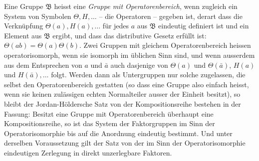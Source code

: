 Eine Gruppe $\mathfrak{B}$ heisst eine \emph{Gruppe mit Operatorenbereich}, wenn zugleich ein System von Symbolen $\Theta,H,\ldots$ -- die Operatoren -- gegeben ist, derart dass die Verknüpfung $\Theta(a),H(a),\ldots$ für jedes $a$ aus $\mathfrak{B}$ eindeutig definiert ist und ein Element aus $\mathfrak{B}$ ergibt, und dass das distributive Gesetz erfüllt ist: $\Theta(ab)=\Theta(a)\Theta(b)$. Zwei Gruppen mit gleichem Operatorenbereich heissen operatorisomorph, wenn sie isomorph im üblichen Sinn sind, und wenn ausserdem aus dem Entsprechen von $a$ und $\bar a$ auch dasjenige von $\Theta(a)$ und $\Theta(\bar a)$, $H(a)$ und $H(\bar a),\ldots$ folgt. Werden dann als Untergruppen nur solche zugelassen, die selbst den Operatorenbereich gestatten (so dass eine Gruppe also einfach heisst, wenn sie keinen zulässigen echten Normalteiler ausser der Einheit besitzt), so bleibt der Jordan-Höldersche Satz von der Kompositionsreihe bestehen in der Fassung: Besitzt eine Gruppe mit Operatorenbereich überhaupt eine Kompositionsreihe, so ist das System der Faktorgruppen im Sinn der Operatorisomorphie bis auf die Anordnung eindeutig bestimmt. Und unter derselben Voraussetzung gilt der Satz von der im Sinn der Operatorisomorphie eindeutigen Zerlegung in direkt unzerlegbare Faktoren.
